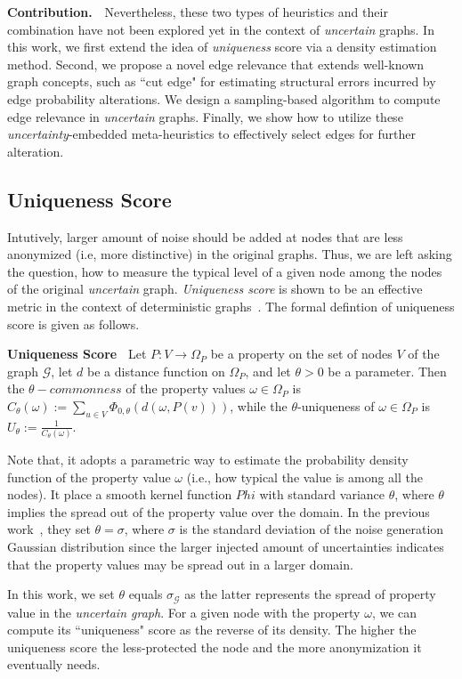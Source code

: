\textbf{Contribution.}~~Nevertheless, these two types of heuristics and their combination have not been explored yet in the context of \emph{uncertain} graphs.
In this work, we first extend the idea of \emph{uniqueness} score via a density estimation method. Second, we propose a novel edge relevance that extends well-known graph concepts, such as ``cut edge" for estimating structural errors incurred by edge probability alterations. We design a sampling-based algorithm to compute edge relevance in \emph{uncertain} graphs. Finally, we show how to utilize these \emph{uncertainty}-embedded meta-heuristics to effectively select edges for further alteration. 

\subsection{Uniqueness Score}
Intutively, larger amount of noise should be added at nodes that are less anonymized (i.e, more distinctive) in the original graphs. Thus, we are left asking the question, how to measure the typical level of a given node among the nodes of the original \emph{uncertain} graph. \emph{Uniqueness score} is shown to be an effective metric in the context of deterministic graphs~\cite{Boldi_Injecting_2012}. The formal defintion of uniqueness score is given as follows. 
\begin{definition}
    \textbf{Uniqueness Score~\cite{Boldi_Injecting_2012}}
     Let $P:V \rightarrow  \Omega_{P}$ be a property on the set of nodes $V$ of the graph $\mathcal{G}$, let $d$ be a distance function on $\Omega_{P}$, and let $\theta >0$  be a parameter. 
  Then the $\theta-commonness$ of the property values $\omega \in \Omega_{P}$ is $C_{\theta}(\omega):= \sum_{u \in V} \Phi_{0,\theta}(d(\omega, P(v)))$,   
while the $\theta$-uniqueness of $\omega \in \Omega_{P}$ is $U_{\theta}:= \frac{1}{C_{\theta}(\omega)}$. 
\end{definition} 

Note that, it adopts a parametric way to estimate the probability density function of the property value $\omega$ (i.e., how typical the value is among all the nodes). It place a smooth kernel function $Phi$ with standard variance $\theta$, where $\theta$ implies the spread out of the property value over the domain.
In the previous work~\cite{Boldi_Injecting_2012}, they set $\theta=\sigma$, where $\sigma$ is the standard deviation of the noise generation Gaussian distribution since the larger injected amount of uncertainties indicates that the property values may be spread out in a larger domain. 

In this work, we set $\theta$ equals $\sigma_{\mathcal{G}}$ as the latter represents the spread of property value in the \emph{uncertain graph}. For a given node with the property $\omega$, we can compute its ``uniqueness" score as the reverse of its density. The higher the uniqueness score the less-protected the node and the more anonymization it eventually needs.







